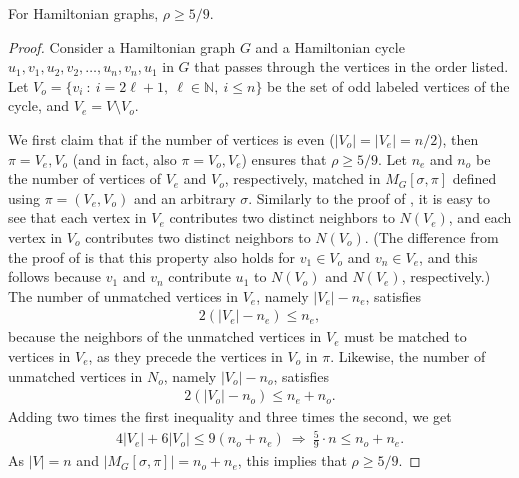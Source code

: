 \documentclass{toc}
\theoremstyle{plain}
\begin{document}
\begin{theorem}
%
%
%
%
  For Hamiltonian graphs, $\rho \ge 5/9$.
%
	\label{thm:hamiltonian-5-9}
\end{theorem}

\begin{proof}
Consider a Hamiltonian graph $G$ and a Hamiltonian cycle $u_1,v_1,u_2,v_2,\ldots, u_n,v_n,u_1$ 
%
%
in $G$ that passes through the vertices in the order listed. %
Let $V_o=\{v_i\ :\ i=2\ell+1,\ \ell\in \mathbb{N},\ i\leq n \}$ be the set of odd labeled vertices of the cycle, and $V_e=V\setminus V_o$.
	
	We first claim that if the number of vertices is even 
%
($|V_o|=|V_e|=n/2$),   %
then $\pi=V_e, V_o$ (and in fact, also $\pi=V_o, V_e$) ensures that $\rho\ge 5/9$.
%
Let $n_e$ and $n_o$ be the number of vertices of $V_e$ and $V_o$, respectively,
%
matched in $M_G[\sigma,\pi]$ defined using $\pi=(V_e,V_o)$ and an arbitrary $\sigma$. %
Similarly   %
to the proof of , it is easy to see that each vertex in $V_e$ contributes two distinct neighbors to $N(V_e)$, and each vertex in $V_o$ contributes two distinct neighbors to $N(V_o)$. %
%
(The difference from the proof of  is that this property also holds for $v_1\in V_o$ and $v_n\in V_e$, and this follows because $v_1$ and $v_n$ contribute $u_1$ to $N(V_o)$ and $N(V_e)$, respectively.)  %
 The number of unmatched vertices in $V_e$, namely $|V_e|-n_e$, satisfies \begin{eqnarray}2(|V_e|-n_e)\leq n_e,   %
	\end{eqnarray} because the neighbors of the unmatched vertices in $V_e$ must be matched to vertices in $V_e$, as they precede the vertices in $V_o$ in  $\pi$. Likewise, the number of unmatched vertices in $N_o$, namely $|V_o|-n_o$, satisfies \begin{eqnarray}2(|V_o|-n_o)\leq n_e+n_o.
\end{eqnarray} Adding two times the first inequality and three times the second, we get \begin{eqnarray}4|V_e| + 6|V_o|\leq 9(n_o+n_e)\ \Rightarrow \ \frac{5}{9}\cdot n\leq n_o+n_e.
\end{eqnarray} As $|V|=n$ and  $|M_G[\sigma,\pi]|=n_o+n_e$, this implies that 
%
$\rho\geq 5/9.$   %
	

\end{proof}
\end{document}

